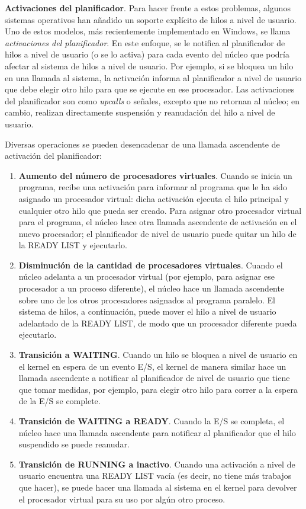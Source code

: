 \documentclass[10pt]{book}
\begin{document}
\textbf{Activaciones del planificador}. Para hacer frente a estos problemas, algunos sistemas operativos han añadido un soporte explícito de hilos a nivel de usuario. Uno de estos modelos, más recientemente implementado en Windows, se llama \textit{activaciones del planificador}. En este enfoque, se le notifica al planificador de hilos a nivel de usuario (o se lo activa) para cada evento del núcleo que podría afectar al sistema de hilos a nivel de usuario. Por ejemplo, si se bloquea un hilo en una llamada al sistema, la activación informa al planificador a nivel de usuario que debe elegir otro hilo para que se ejecute en ese procesador. Las activaciones del planificador son como \textit{upcalls} o señales, excepto que no retornan al núcleo; en cambio, realizan directamente suspensión y reanudación del hilo a nivel de usuario.

Diversas operaciones se pueden desencadenar de una llamada ascendente de activación del planificador:
\begin{enumerate}
\item \textbf{Aumento del número de procesadores virtuales}. Cuando se inicia un programa, recibe una activación para informar al programa que le ha sido asignado un procesador virtual: dicha activación ejecuta el hilo principal y cualquier otro hilo que pueda ser creado. Para asignar otro procesador virtual para el programa, el núcleo hace otra llamada ascendente de activación en el nuevo procesador; el planificador de nivel de usuario puede quitar un hilo de la READY LIST y ejecutarlo.

\item \textbf{Disminución de la cantidad de procesadores virtuales}. Cuando el núcleo adelanta a un procesador virtual (por ejemplo, para asignar ese procesador a un proceso diferente), el núcleo hace un llamada ascendente sobre uno de los otros procesadores asignados al programa paralelo. El sistema de hilos, a continuación, puede mover el hilo a nivel de usuario adelantado de la READY LIST, de modo que un procesador diferente pueda ejecutarlo.

\item \textbf{Transición a WAITING}. Cuando un hilo se bloquea a nivel de usuario en el kernel en espera de un evento E/S, el kernel de manera similar hace un llamada ascendente a notificar al planificador de nivel de usuario que tiene que tomar medidas, por ejemplo, para elegir otro hilo para correr a la espera de la E/S se complete.

\item \textbf{Transición de WAITING a READY}. Cuando la E/S se completa, el núcleo hace una llamada ascendente para notificar al planificador que el hilo suspendido se puede reanudar.

\item \textbf{Transición de RUNNING a inactivo}. Cuando una activación a nivel de usuario encuentra una READY LIST vacía (es decir, no tiene más trabajos que hacer), se puede hacer una llamada al sistema en el kernel para devolver el procesador virtual para su uso por algún otro proceso.
\end{enumerate}
\end{document}
